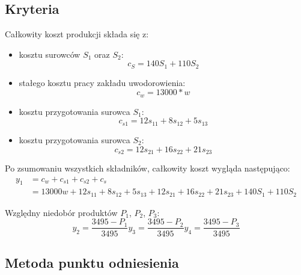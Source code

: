 \documentclass[a4paper,10pt,fleqn]{article}
\begin{document}
		\subsection{Kryteria}
		Całkowity koszt produkcji składa się z:
		\begin{itemize}
			\item kosztu surowców $S_1$ oraz $S_2$:
				\begin{equation}
					c_S = 140S_1 + 110S_2
				\end{equation}
			\item stałego kosztu pracy zakładu uwodorowienia:
				\begin{equation}
					c_w = 13000*w
				\end{equation}
			\item kosztu przygotowania surowca $S_1$:
				\begin{equation}
					c_{s1} = 12s_{11} + 8s_{12} + 5s_{13}
				\end{equation}
			\item kosztu przygotowania surowca $S_2$:
				\begin{equation}
					c_{s2} = 12s_{21} + 16s_{22} + 21s_{23}
				\end{equation}
		\end{itemize}

		Po zsumowaniu wszystkich składników, całkowity koszt wygląda następująco:
		\begin{equation}
			\begin{split}
				y_1 &= c_w + c_{s1} + c_{s2} + c_s \\
			& = 13000w + 12s_{11} + 8s_{12} + 5s_{13} + 12s_{21} + 16s_{22} + 21s_{23} + 140S_1 + 110S_2
			\end{split}
		\end{equation}

		Względny niedobór produktów $P_1$, $P_2$, $P_3$:
		\begin{subequations}
			\begin{equation}
				y_{2}= \frac{3495-P_1}{3495}
			\end{equation}
			\begin{equation}
				y_{3}= \frac{3495-P_2}{3495}
			\end{equation}
			\begin{equation}
				y_{4}= \frac{3495-P_3}{3495}
			\end{equation}
		\end{subequations}

		\subsection{Metoda punktu odniesienia}
\end{document}
